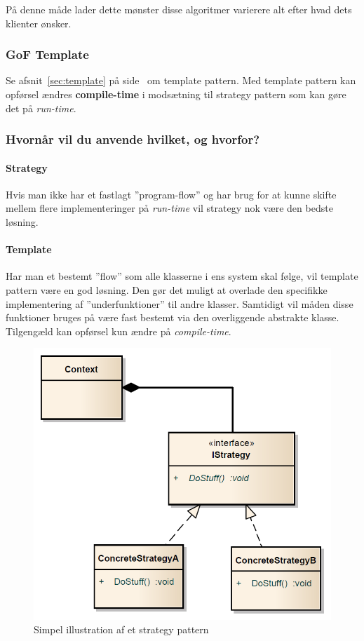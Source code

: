 På denne måde lader dette mønster disse algoritmer varierere alt efter hvad dets klienter ønsker.

\subsubsection{GoF Template}
Se afsnit~\ref{sec:template} på side~\pageref{sec:template} om template pattern. Med template pattern kan opførsel ændres \textbf{compile-time} i modsætning til strategy pattern som kan gøre det på \textit{run-time}.

\subsubsection{Hvornår vil du anvende hvilket, og hvorfor?}
\paragraph{Strategy}
Hvis man ikke har et fastlagt ''program-flow'' og har brug for at kunne skifte mellem flere implementeringer på \textit{run-time} vil strategy nok være den bedste løsning.

\paragraph{Template}
Har man et bestemt ''flow'' som alle klasserne i ens system skal følge, vil template pattern være en god løsning. Den gør det muligt at overlade den specifikke implementering af ''underfunktioner'' til andre klasser. Samtidigt vil måden disse funktioner bruges på være fast bestemt via den overliggende abstrakte klasse. Tilgengæld kan opførsel kun ændre på \textit{compile-time}.

\begin{figure}[h]
	\centering
	\includegraphics[width=0.6\linewidth]{figs/strategyPattern.PNG}
	\caption[UML for et strategy pattern]{Simpel illustration af et strategy pattern}
	\label{fig:strategyPattern}
\end{figure}

